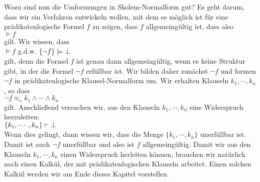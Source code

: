 Wozu sind nun die Umformungen in Skolem-Normalform gut?  Es geht darum, dass wir 
ein Verfahren entwickeln wollen, mit dem es m\"{o}glich ist f\"{u}r eine pr\"{a}dikatenlogische Formel
$f$ zu zeigen, dass $f$ allgemeing\"{u}ltig ist, dass also \\[0.2cm]
\hspace*{1.3cm} $\models f$ \\[0.2cm]
gilt.  Wir wissen, dass \\[0.2cm]
\hspace*{1.3cm} $\models f$ \quad g.d.w. \quad $\{\neg f\} \models \bot$ \\[0.2cm]
gilt, denn die Formel $f$ ist genau dann allgemeing\"{u}ltig, wenn es keine Struktur gibt, in
der die Formel $\neg f$ erf\"{u}llbar ist. 
 Wir bilden daher zun\"{a}chst $\neg f$ und formen $\neg f$ in pr\"{a}dikatenlogische
Klausel-Normalform um.  Wir erhalten Klauseln $k_1, \cdots, k_n$, so dass  \\[0.2cm]
\hspace*{1.3cm} $\neg f \approx_e k_1 \wedge \cdots \wedge k_n$ \\[0.2cm]
gilt.  Anschlie\ss{}end versuchen wir,
aus den Klauseln $k_1,\cdots,k_n$ eine Widerspruch herzuleiten: \\[0.2cm]
\hspace*{1.3cm} $\{k_1, \cdots, k_n\} \vdash \bot$ \\[0.2cm]
Wenn dies gelingt, dann wissen wir, dass die Menge $\{k_1, \cdots, k_n\}$ unerf\"{u}llbar ist.
Damit ist auch $\neg f$ unerf\"{u}llbar und also ist $f$ allgemeing\"{u}ltig.
Damit wir aus den Klauseln $k_1,\cdots,k_n$ einen Widerspruch herleiten k\"{o}nnen,
brauchen wir nat\"{u}rlich noch einen Kalk\"{u}l, der mit pr\"{a}dikatenlogischen Klauseln arbeitet. 
Einen solchen Kalk\"{u}l werden wir am Ende dieses Kapitel vorstellen.

